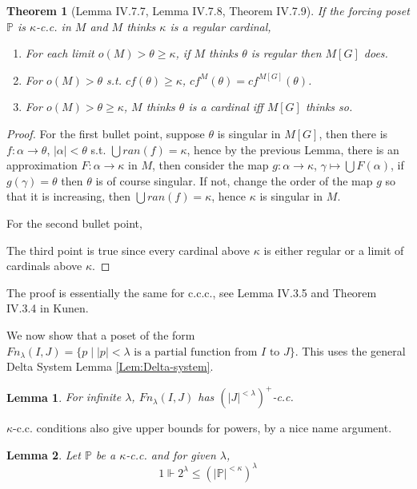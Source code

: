 \documentclass{article}
\newtheorem{lemma}{Lemma}
\newtheorem{theorem}{Theorem}
\newcommand{\bbP}{\mathbb{P}}
\begin{document}
\begin{theorem}[Lemma IV.7.7, Lemma IV.7.8, Theorem IV.7.9]\label{thm:c.c.c.-cardinality-preservation}
    If the forcing poset $\mathbb{P}$ is $\kappa$-c.c. in $M$ and $M$ thinks $\kappa$ is a regular cardinal, 
    \begin{enumerate}
        \item For each limit $o(M)>\theta\geq \kappa$, if $M$ thinks $\theta$ is regular then $M[G]$ does.
        \item For $o(M)>\theta$ s.t. $cf(\theta) \geq \kappa$, $cf^M(\theta) = cf^{M[G]}(\theta)$.
        \item For $o(M)>\theta\geq \kappa$, $M$ thinks $\theta$ is a cardinal iff $M[G]$ thinks so. 
    \end{enumerate}
\end{theorem}

\begin{proof}
    For the first bullet point, suppose $\theta$ is singular in $M[G]$, then there is $f:\alpha\to \theta$, $|\alpha|<\theta$ s.t. $\bigcup ran(f) = \kappa$, hence by the previous Lemma, there is an approximation $F: \alpha\to \mathcal{\kappa}$ in $M$, then consider the map $g: \alpha\to \kappa$, $\gamma \mapsto\bigcup F(\alpha)$, if $g(\gamma) = \theta$ then $\theta$ is of course singular. If not, change the order of the map $g$ so that it is increasing, then $\bigcup ran(f) = \kappa $, hence $\kappa$ is singular in $M$.

    For the second bullet point, 

    The third point is true since every cardinal above $\kappa$ is either regular or a limit of cardinals above $\kappa$.
\end{proof}

The proof is essentially the same for c.c.c., see Lemma IV.3.5 and Theorem IV.3.4 in Kunen.

We now show that a poset of the form $Fn_\lambda(I,J) = \{p\mid |p|<\lambda\text{ is a partial function from }I \text{ to }J\}$. This uses the general Delta System Lemma \ref{Lem:Delta-system}.



\begin{lemma}
    For infinite $\lambda$, $Fn_\lambda(I,J)$ has  $(|J|^{<\lambda})^+$-c.c.
\end{lemma}

$\kappa$-c.c. conditions also give upper bounds for powers, by a nice name argument.

\begin{lemma}\label{lem:nice-name-counting}
    Let $\bbP$ be a $\kappa$-c.c. and for given $\lambda$, $$1\Vdash 2^\lambda \leq (|\bbP|^{<\kappa})^{\lambda}$$
\end{lemma}
\end{document}
